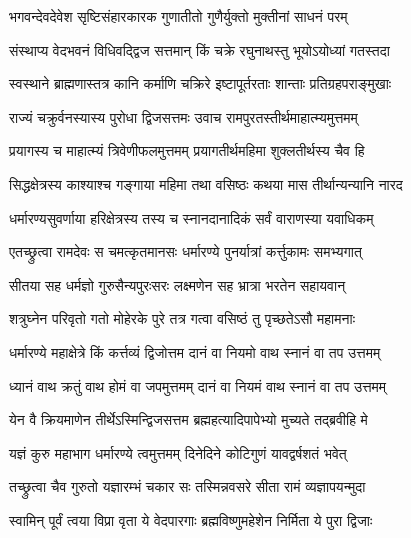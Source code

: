\resetShloka


\twolineshloka
{भगवन्देवदेवेश सृष्टिसंहारकारक}
{गुणातीतो गुणैर्युक्तो मुक्तीनां साधनं परम्}%

\twolineshloka
{संस्थाप्य वेदभवनं विधिवद्द्विज सत्तमान्}
{किं चक्रे रघुनाथस्तु भूयोऽयोध्यां गतस्तदा}%


\twolineshloka
{स्वस्थाने ब्राह्मणास्तत्र कानि कर्माणि चक्रिरे}
{इष्टापूर्तरताः शान्ताः प्रतिग्रहपराङ्मुखाः}%

\twolineshloka
{राज्यं चक्रुर्वनस्यास्य पुरोधा द्विजसत्तमः}
{उवाच रामपुरतस्तीर्थमाहात्म्यमुत्तमम्}%

\twolineshloka
{प्रयागस्य च माहात्म्यं त्रिवेणीफलमुत्तमम्}
{प्रयागतीर्थमहिमा शुक्लतीर्थस्य चैव हि}%

\twolineshloka
{सिद्धक्षेत्रस्य काश्याश्च गङ्गाया महिमा तथा}
{वसिष्ठः कथया मास तीर्थान्यन्यानि नारद}%

\twolineshloka
{धर्मारण्यसुवर्णाया हरिक्षेत्रस्य तस्य च}
{स्नानदानादिकं सर्वं वाराणस्या यवाधिकम्}%

\twolineshloka
{एतच्छ्रुत्वा रामदेवः स चमत्कृतमानसः}
{धर्मारण्ये पुनर्यात्रां कर्त्तुकामः समभ्यगात्}%

\twolineshloka
{सीतया सह धर्मज्ञो गुरुसैन्यपुरःसरः}
{लक्ष्मणेन सह भ्रात्रा भरतेन सहायवान्}%

\twolineshloka
{शत्रुघ्नेन परिवृतो गतो मोहेरके पुरे}
{तत्र गत्वा वसिष्ठं तु पृच्छतेऽसौ महामनाः}%


\twolineshloka
{धर्मारण्ये महाक्षेत्रे किं कर्त्तव्यं द्विजोत्तम}
{दानं वा नियमो वाथ स्नानं वा तप उत्तमम्}%

\twolineshloka
{ध्यानं वाथ क्रतुं वाथ होमं वा जपमुत्तमम्}
{दानं वा नियमं वाथ स्नानं वा तप उत्तमम्}%

\twolineshloka
{येन वै क्रियमाणेन तीर्थेऽस्मिन्द्विजसत्तम}
{ब्रह्महत्यादिपापेभ्यो मुच्यते तद्ब्रवीहि मे}%


\twolineshloka
{यज्ञं कुरु महाभाग धर्मारण्ये त्वमुत्तमम्}
{दिनेदिने कोटिगुणं यावद्वर्षशतं भवेत्}%

\twolineshloka
{तच्छ्रुत्वा चैव गुरुतो यज्ञारम्भं चकार सः}
{तस्मिन्नवसरे सीता रामं व्यज्ञापयन्मुदा}%

\twolineshloka
{स्वामिन् पूर्वं त्वया विप्रा वृता ये वेदपारगाः}
{ब्रह्मविष्णुमहेशेन निर्मिता ये पुरा द्विजाः}%

